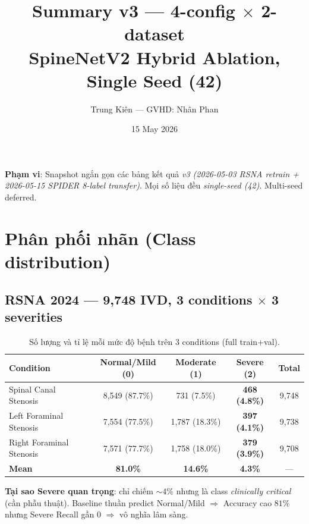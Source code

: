 \documentclass[11pt,a4paper]{article}
\title{Summary v3 --- 4-config $\times$ 2-dataset\\
       \large SpineNetV2 Hybrid Ablation, Single Seed (42)}
\author{Trung Kiên --- GVHD: Nhân Phan}
\date{15 May 2026}
\begin{document}
\maketitle

\noindent\textbf{Phạm vi}: Snapshot ngắn gọn các bảng kết quả \emph{v3
(2026-05-03 RSNA retrain + 2026-05-15 SPIDER 8-label transfer)}. Mọi số
liệu đều \emph{single-seed (42)}. Multi-seed deferred.

\section{Phân phối nhãn (Class distribution)}

\subsection{RSNA 2024 --- 9{,}748 IVD, 3 conditions $\times$ 3 severities}

\begin{table}[h]
\centering
\caption{Số lượng và tỉ lệ mỗi mức độ bệnh trên 3 conditions (full train+val).}
\label{tab:rsna_distribution}
\small
\begin{tabular}{lccc|c}
\toprule
\rowcolor{tablehdr}
Condition & \cellcolor{cnormal!30}Normal/Mild (0) & \cellcolor{cmod!30}Moderate (1) & \cellcolor{csevere!30}Severe (2) & Total \\
\midrule
Spinal Canal Stenosis  & 8{,}549 (87.7\%) & 731 (7.5\%)      & \textbf{468 (4.8\%)}  & 9{,}748 \\
Left Foraminal Stenosis  & 7{,}554 (77.5\%) & 1{,}787 (18.3\%) & \textbf{397 (4.1\%)}  & 9{,}738 \\
Right Foraminal Stenosis & 7{,}571 (77.7\%) & 1{,}758 (18.0\%) & \textbf{379 (3.9\%)}  & 9{,}708 \\
\midrule
\textbf{Mean}          & \textbf{81.0\%}  & \textbf{14.6\%}  & \textbf{4.3\%}        & --- \\
\bottomrule
\end{tabular}
\end{table}

\noindent\textbf{Tại sao Severe quan trọng}: chỉ chiếm $\sim 4\%$ nhưng
là class \emph{clinically critical} (cần phẫu thuật). Baseline thuần
predict Normal/Mild $\Rightarrow$ Accuracy cao $81\%$ nhưng Severe
Recall gần $0$ $\Rightarrow$ vô nghĩa lâm sàng.
\end{document}

